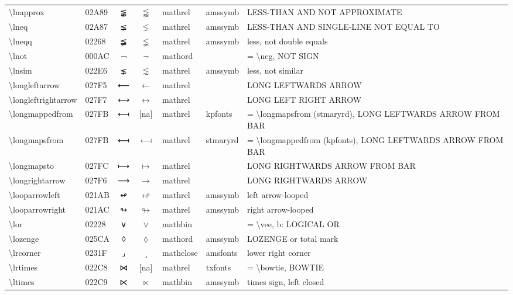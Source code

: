 \documentclass[a4paper,landscape]{article}
\begin{document}
\begin{longtable}{llcclll}
\textbackslash{}lnapprox & 02A89 & ⪉ & $\lnapprox$ & mathrel & amssymb & LESS-THAN AND NOT APPROXIMATE \\
\textbackslash{}lneq & 02A87 & ⪇ & $\lneq$ & mathrel & amssymb & LESS-THAN AND SINGLE-LINE NOT EQUAL TO \\
\textbackslash{}lneqq & 02268 & ≨ & $\lneqq$ & mathrel & amssymb & less, not double equals \\
\textbackslash{}lnot & 000AC & ¬ & $\lnot$ & mathord &  & = \textbackslash{}neg,  NOT SIGN \\
\textbackslash{}lnsim & 022E6 & ⋦ & $\lnsim$ & mathrel & amssymb & less, not similar \\
\textbackslash{}longleftarrow & 027F5 & ⟵ & $\longleftarrow$ & mathrel &  & LONG LEFTWARDS ARROW \\
\textbackslash{}longleftrightarrow & 027F7 & ⟷ & $\longleftrightarrow$ & mathrel &  & LONG LEFT RIGHT ARROW \\
\textbackslash{}longmappedfrom & 027FB & ⟻ & [na] & mathrel & kpfonts & = \textbackslash{}longmapsfrom (stmaryrd),  LONG LEFTWARDS ARROW FROM BAR \\
\textbackslash{}longmapsfrom & 027FB & ⟻ & $\longmapsfrom$ & mathrel & stmaryrd & = \textbackslash{}longmappedfrom (kpfonts), LONG LEFTWARDS ARROW FROM BAR \\
\textbackslash{}longmapsto & 027FC & ⟼ & $\longmapsto$ & mathrel &  & LONG RIGHTWARDS ARROW FROM BAR \\
\textbackslash{}longrightarrow & 027F6 & ⟶ & $\longrightarrow$ & mathrel &  & LONG RIGHTWARDS ARROW \\
\textbackslash{}looparrowleft & 021AB & ↫ & $\looparrowleft$ & mathrel & amssymb & left arrow-looped \\
\textbackslash{}looparrowright & 021AC & ↬ & $\looparrowright$ & mathrel & amssymb & right arrow-looped \\
\textbackslash{}lor & 02228 & ∨ & $\lor$ & mathbin &  & = \textbackslash{}vee,  b: LOGICAL OR \\
\textbackslash{}lozenge & 025CA & ◊ & $\lozenge$ & mathord & amssymb & LOZENGE or total mark \\
\textbackslash{}lrcorner & 0231F & ⌟ & $\lrcorner$ & mathclose & amsfonts & lower right corner \\
\textbackslash{}lrtimes & 022C8 & ⋈ & [na] & mathrel & txfonts & = \textbackslash{}bowtie,  BOWTIE \\
\textbackslash{}ltimes & 022C9 & ⋉ & $\ltimes$ & mathbin & amssymb & times sign, left closed \\

\end{longtable}
\end{document}
